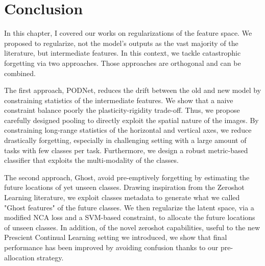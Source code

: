\section{Conclusion}

In this chapter, I covered our works on regularizations of the feature space. We proposed to
regularize, not the model's outputs as the vast majority of the literature, but intermediate
features. In this context, we tackle catastrophic forgetting via two approaches. Those approaches
are orthogonal and can be combined.

The first approach, PODNet, reduces the drift between the old and new model by constraining
statistics of the intermediate features. We show that a naive constraint balance poorly the
plasticity-rigidity trade-off. Thus, we propose carefully designed pooling to directly exploit the
spatial nature of the images. By constraining long-range statistics of the horizontal and vertical
axes, we reduce drastically forgetting, especially in challenging setting with a large amount of
tasks with few classes per task. Furthermore, we design a robust metric-based classifier that
exploits the multi-modality of the classes.

The second approach, Ghost, avoid pre-emptively forgetting by estimating the future locations of
yet unseen classes. Drawing inspiration from the Zeroshot Learning literature, we exploit classes
metadata to generate what we called "Ghost features" of the future classes. We then regularize
the latent space, via a modified NCA loss and a SVM-based constraint, to allocate the future
locations of unseen classes. In addition, of the novel zeroshot capabilities, useful to the new
Prescient Continual Learning setting we introduced, we show that final performance has been improved
by avoiding confusion thanks to our pre-allocation strategy.
